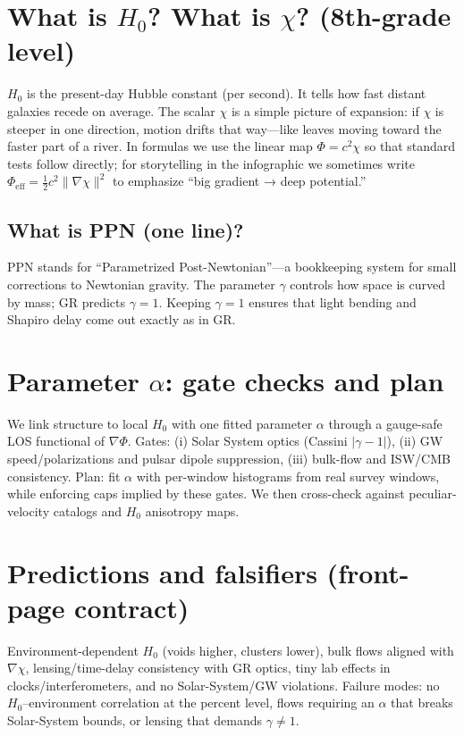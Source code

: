 \documentclass[11pt]{article}
\begin{document}
\section*{What is $H_0$? What is $\chi$? (8th-grade level)}
$H_0$ is the present-day Hubble constant (per second). It tells how fast distant galaxies recede on average. The scalar $\chi$ is a simple picture of expansion: if $\chi$ is steeper in one direction, motion drifts that way—like leaves moving toward the faster part of a river. In formulas we use the linear map $\Phi=c^{2}\chi$ so that standard tests follow directly; for storytelling in the infographic we sometimes write $\Phi_{\mathrm{eff}}=\frac{1}{2} c^{2}\|\nabla\chi\|^{2}$ to emphasize “big gradient → deep potential.”

\subsection*{What is PPN (one line)?}
PPN stands for ``Parametrized Post-Newtonian''—a bookkeeping system for small corrections to Newtonian gravity. The parameter $\gamma$ controls how space is curved by mass; GR predicts $\gamma=1$. Keeping $\gamma=1$ ensures that light bending and Shapiro delay come out exactly as in GR.

\section*{Parameter $\alpha$: gate checks and plan}
We link structure to local $H_0$ with one fitted parameter $\alpha$ through a gauge-safe LOS functional of $\nabla\Phi$. Gates: (i) Solar System optics (Cassini $|\gamma-1|$), (ii) GW speed/polarizations and pulsar dipole suppression, (iii) bulk-flow and ISW/CMB consistency. Plan: fit $\alpha$ with per-window histograms from real survey windows, while enforcing caps implied by these gates. We then cross-check against peculiar-velocity catalogs and $H_0$ anisotropy maps.

\section*{Predictions and falsifiers (front-page contract)}
Environment-dependent $H_0$ (voids higher, clusters lower), bulk flows aligned with $\nabla\chi$, lensing/time-delay consistency with GR optics, tiny lab effects in clocks/interferometers, and no Solar-System/GW violations. Failure modes: no $H_0$–environment correlation at the percent level, flows requiring an $\alpha$ that breaks Solar-System bounds, or lensing that demands $\gamma\neq1$.
\end{document}

